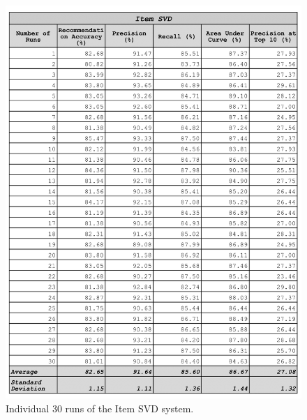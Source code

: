 \begin{appendices}
\begin{figure}
\centering
\includegraphics[scale=0.3]{appendices/item_als_30_runs.png}
\caption{Individual 30 runs of the Item SVD system. }
\label{fig:dual_algorithm}
\end{figure}


\end{appendices}
